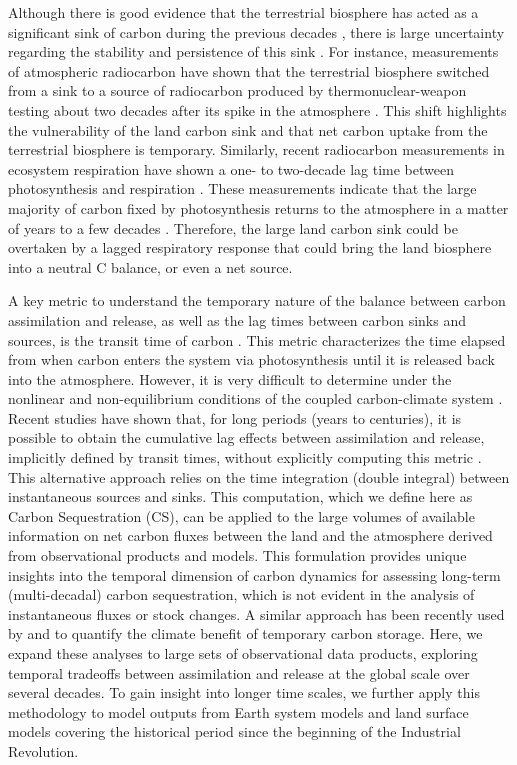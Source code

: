 \documentclass[ProofPDF]{./Styles/Jnls-Template-V3}
\begin{document}
Although there is good evidence that the terrestrial biosphere has acted as a significant sink of carbon during the previous decades \citep{Walker2021,Ruehr2023,Sitch2024}, there is large uncertainty regarding the stability and persistence of this sink \citep{Canadell2007,Fernandez-Martinez2023}. For instance, measurements of atmospheric radiocarbon have shown that the terrestrial biosphere switched from a sink to a source of radiocarbon produced by thermonuclear-weapon testing about two decades after its spike in the atmosphere \citep{Naegler2009,Levin2022}. This shift highlights the vulnerability of the land carbon sink and that net carbon uptake from the terrestrial biosphere is temporary. Similarly, recent radiocarbon measurements in ecosystem respiration have shown a one- to two-decade lag time between photosynthesis and respiration \citep{Tangarife2024JGR,Chanca2025}. These measurements indicate that the large majority of carbon fixed by photosynthesis returns to the atmosphere in a matter of years to a few decades \citep{Sierra2023PTRS}. Therefore, the large land carbon sink could be overtaken by a lagged respiratory response that could bring the land biosphere into a neutral C balance, or even a net source. 

A key metric to understand the temporary nature of the balance between carbon assimilation and release, as well as the lag times between carbon sinks and sources, is the transit time of carbon \citep{Thompson1999}. This metric characterizes the time elapsed from when carbon enters the system via photosynthesis until it is released back into the atmosphere. However, it is very difficult to determine under the nonlinear and non-equilibrium conditions of the coupled carbon-climate system \citep{Rasmussen2016,Metzler2018PNAS}. Recent studies have shown that, for long periods (years to centuries), it is possible to obtain the cumulative lag effects between assimilation and release, implicitly defined by transit times, without explicitly computing this metric \citep{Metzler2024,Sierra2025}. This alternative approach relies on the time integration (double integral) between instantaneous sources and sinks. This computation, which we define here as Carbon Sequestration (CS), can be applied to the large volumes of available information on net carbon fluxes between the land and the atmosphere derived from observational products and models. This formulation provides unique insights into the temporal dimension of carbon dynamics for assessing long-term (multi-decadal) carbon sequestration, which is not evident in the analysis of instantaneous fluxes or stock changes. A similar approach has been recently used by \citet{Matthews2023} and \citet{Metzler2024} to quantify the climate benefit of temporary carbon storage. Here, we expand these analyses to large sets of observational data products, exploring temporal tradeoffs between assimilation and release at the global scale over several decades. To gain insight into longer time scales, we further apply this methodology to model outputs from Earth system models and land surface models covering the historical period since the beginning of the Industrial Revolution.
\end{document}
